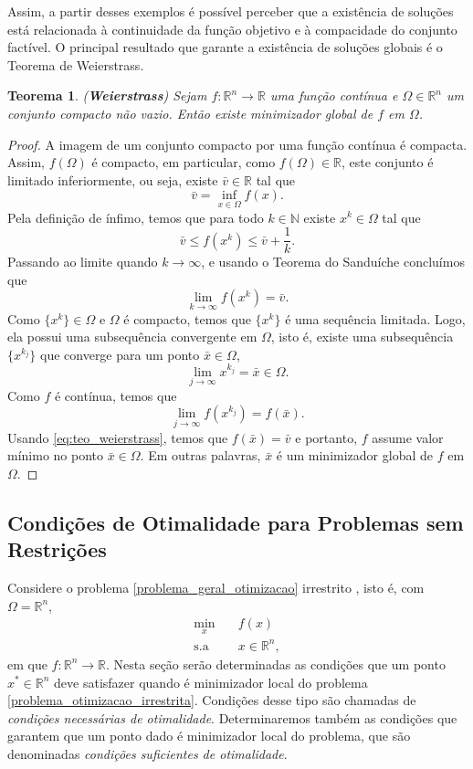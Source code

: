 \documentclass[12pt,a4paper]{scrartcl}
\def\RR{\mathds{R}}
\newtheorem{teo}{Teorema}
\theoremstyle{definition}%
\begin{document}
Assim, a partir desses exemplos é possível perceber que a existência de soluções está relacionada à continuidade da função objetivo e à compacidade do conjunto factível. O principal resultado que garante a existência de soluções globais é o Teorema de Weierstrass.

\begin{teo}(\textbf{Weierstrass}) \label{teo:weierstrass}
Sejam $f: \RR^{n} \rightarrow \RR$ uma função contínua e $\Omega \in \RR^{n}$ um conjunto compacto não vazio. Então existe minimizador global de $f$ em $\Omega$.
\end{teo}
\begin{proof}
A imagem de um conjunto compacto por uma função contínua é compacta. Assim, $f(\Omega)$ é compacto, em particular, como $f(\Omega) \in \RR$, este conjunto é limitado inferiormente, ou seja, existe $\bar{v} \in \RR$ tal que
\[
\bar{v} = \inf_{x\in \Omega} f(x).
\]
Pela definição de ínfimo, temos que para todo $k\in \mathds{N}$ existe $x^{k} \in \Omega$ tal que 
\[
\bar{v} \leq f(x^{k}) \leq \bar{v} + \dfrac{1}{k} .
\]
Passando ao limite quando $k \rightarrow \infty $, e usando o Teorema do Sanduíche concluímos que
\[\label{eq:teo_weierstrass}
\lim_{k \rightarrow \infty} f(x^{k}) = \bar{v}.
\]
Como $\{ x^{k} \} \in \Omega$ e $\Omega$ é compacto, temos que $\{ x^{k} \}$ é uma sequência limitada. Logo, ela possui uma subsequência convergente em $\Omega$, isto é, existe uma subsequência $\{ x^{k_{j}} \}$ que converge para um ponto $\bar{x} \in \Omega$,
\[
\lim_{j \rightarrow \infty} x^{k_{j}} = \bar{x} \in \Omega .
\]
Como $f$ é contínua, temos que
\[
\lim_{j \rightarrow \infty} f(x^{k_{j}}) = f(\bar{x}).
\]
Usando \eqref{eq:teo_weierstrass}, temos que $f(\bar{x}) = \bar{v}$ e portanto, $f$ assume valor mínimo no ponto $\bar{x} \in \Omega$. Em outras palavras, $\bar{x}$ é um minimizador global de $f$ em $\Omega$.
\end{proof}


\subsection{Condições de Otimalidade para Problemas sem Restrições} \label{subsection:irrestrito}

Considere o problema \eqref{problema_geral_otimizacao} irrestrito , isto é, com $\Omega = \RR^{n}$,
\[ \label{problema_otimizacao_irrestrita}
\begin{aligned}
\min_{x} & \quad f(x) \\
\text{s.a} & \quad x \in \RR^{n} ,
\end{aligned}
\]
em que $f:\RR^{n} \rightarrow \RR$. Nesta seção serão determinadas as condições que um ponto $x^{*} \in \RR^{n}$ deve satisfazer quando é minimizador local do problema \eqref{problema_otimizacao_irrestrita}. Condições desse tipo são chamadas de \emph{condições necessárias de otimalidade}. Determinaremos também as condições que garantem que um ponto dado é minimizador local do problema, que são denominadas \emph{condições suficientes de otimalidade}. 
\end{document}
